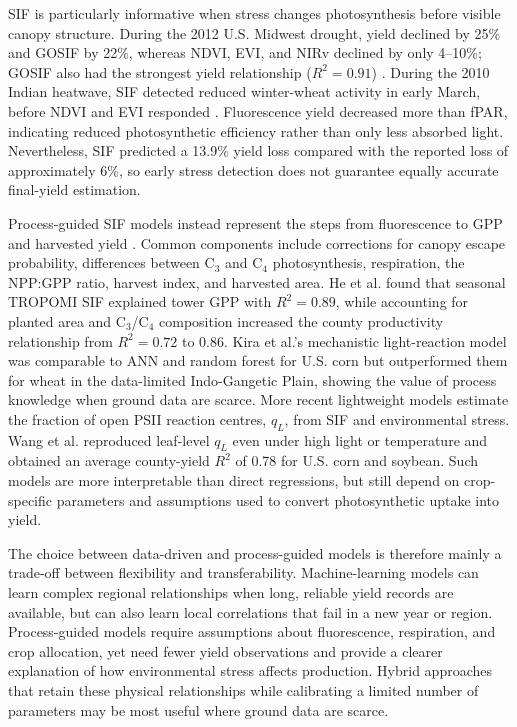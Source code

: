SIF is particularly informative when stress changes photosynthesis before visible canopy structure. During the 2012 U.S. Midwest drought, yield declined by 25\% and GOSIF by 22\%, whereas NDVI, EVI, and NIRv declined by only 4--10\%; GOSIF also had the strongest yield relationship ($R^2=0.91$) \cite{qiu2022monitoring}. During the 2010 Indian heatwave, SIF detected reduced winter-wheat activity in early March, before NDVI and EVI responded \cite{song2018satellite}. Fluorescence yield decreased more than fPAR, indicating reduced photosynthetic efficiency rather than only less absorbed light. Nevertheless, SIF predicted a 13.9\% yield loss compared with the reported loss of approximately 6\%, so early stress detection does not guarantee equally accurate final-yield estimation.

Process-guided SIF models instead represent the steps from fluorescence to GPP and harvested yield \cite{guan2016improving}\cite{he2020ground}\cite{kira2024scalable}\cite{xue2025lightweight}\cite{wang2025practical}. Common components include corrections for canopy escape probability, differences between C$_3$ and C$_4$ photosynthesis, respiration, the NPP:GPP ratio, harvest index, and harvested area. He et al. found that seasonal TROPOMI SIF explained tower GPP with $R^2=0.89$, while accounting for planted area and C$_3$/C$_4$ composition increased the county productivity relationship from $R^2=0.72$ to 0.86. Kira et al.'s mechanistic light-reaction model was comparable to ANN and random forest for U.S. corn but outperformed them for wheat in the data-limited Indo-Gangetic Plain, showing the value of process knowledge when ground data are scarce. More recent lightweight models estimate the fraction of open PSII reaction centres, $q_L$, from SIF and environmental stress. Wang et al. reproduced leaf-level $q_L$ even under high light or temperature and obtained an average county-yield $R^2$ of 0.78 for U.S. corn and soybean. Such models are more interpretable than direct regressions, but still depend on crop-specific parameters and assumptions used to convert photosynthetic uptake into yield.

The choice between data-driven and process-guided models is therefore mainly a trade-off between flexibility and transferability. Machine-learning models can learn complex regional relationships when long, reliable yield records are available, but can also learn local correlations that fail in a new year or region. Process-guided models require assumptions about fluorescence, respiration, and crop allocation, yet need fewer yield observations and provide a clearer explanation of how environmental stress affects production. Hybrid approaches that retain these physical relationships while calibrating a limited number of parameters may be most useful where ground data are scarce.

